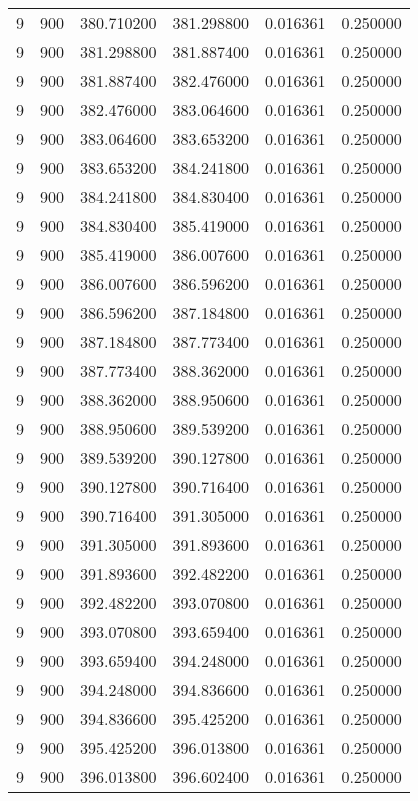 \begin{longtable}{rrrrrr}
9 & 900 & 380.710200 & 381.298800 & 0.016361 & 0.250000 \\
9 & 900 & 381.298800 & 381.887400 & 0.016361 & 0.250000 \\
9 & 900 & 381.887400 & 382.476000 & 0.016361 & 0.250000 \\
9 & 900 & 382.476000 & 383.064600 & 0.016361 & 0.250000 \\
9 & 900 & 383.064600 & 383.653200 & 0.016361 & 0.250000 \\
9 & 900 & 383.653200 & 384.241800 & 0.016361 & 0.250000 \\
9 & 900 & 384.241800 & 384.830400 & 0.016361 & 0.250000 \\
9 & 900 & 384.830400 & 385.419000 & 0.016361 & 0.250000 \\
9 & 900 & 385.419000 & 386.007600 & 0.016361 & 0.250000 \\
9 & 900 & 386.007600 & 386.596200 & 0.016361 & 0.250000 \\
9 & 900 & 386.596200 & 387.184800 & 0.016361 & 0.250000 \\
9 & 900 & 387.184800 & 387.773400 & 0.016361 & 0.250000 \\
9 & 900 & 387.773400 & 388.362000 & 0.016361 & 0.250000 \\
9 & 900 & 388.362000 & 388.950600 & 0.016361 & 0.250000 \\
9 & 900 & 388.950600 & 389.539200 & 0.016361 & 0.250000 \\
9 & 900 & 389.539200 & 390.127800 & 0.016361 & 0.250000 \\
9 & 900 & 390.127800 & 390.716400 & 0.016361 & 0.250000 \\
9 & 900 & 390.716400 & 391.305000 & 0.016361 & 0.250000 \\
9 & 900 & 391.305000 & 391.893600 & 0.016361 & 0.250000 \\
9 & 900 & 391.893600 & 392.482200 & 0.016361 & 0.250000 \\
9 & 900 & 392.482200 & 393.070800 & 0.016361 & 0.250000 \\
9 & 900 & 393.070800 & 393.659400 & 0.016361 & 0.250000 \\
9 & 900 & 393.659400 & 394.248000 & 0.016361 & 0.250000 \\
9 & 900 & 394.248000 & 394.836600 & 0.016361 & 0.250000 \\
9 & 900 & 394.836600 & 395.425200 & 0.016361 & 0.250000 \\
9 & 900 & 395.425200 & 396.013800 & 0.016361 & 0.250000 \\
9 & 900 & 396.013800 & 396.602400 & 0.016361 & 0.250000 \\

\end{longtable}

